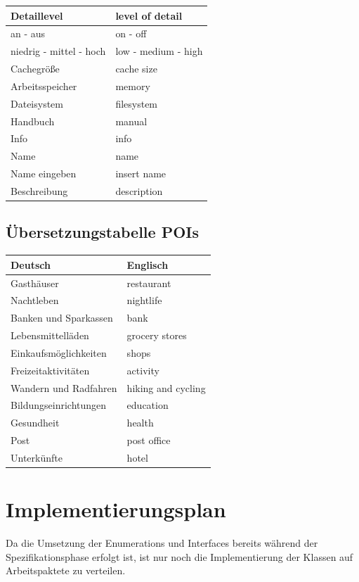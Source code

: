 \documentclass[10pt]{scrreprt}
\begin{document}
\begin{longtable}{|p{7.5cm}|p{7.5cm}|}
\hline
Detaillevel & level of detail \\
\hline
an - aus & on - off \\
\hline
niedrig - mittel - hoch & low - medium - high\\
\hline
Cachegröße & cache size \\
\hline
Arbeitsspeicher & memory \\
\hline
Dateisystem & filesystem \\
\hline
Handbuch & manual \\
\hline
Info & info \\
\hline
Name & name \\
\hline
Name eingeben & insert name \\
\hline
Beschreibung & description \\
\hline
\end{longtable}

\newpage
\section{Übersetzungstabelle POIs}
\begin{longtable}{|p{7.5cm}|p{7.5cm}|}
\hline 
\textbf{Deutsch} & \textbf{Englisch} \\ 
\hline
\hline 
Gasthäuser & restaurant \\ 
\hline
Nachtleben & nightlife \\ 
\hline
Banken und Sparkassen & bank \\ 
\hline
Lebensmittelläden & grocery stores \\ 
\hline
Einkaufsmöglichkeiten & shops \\ 
\hline
Freizeitaktivitäten & activity \\ 
\hline
Wandern und Radfahren & hiking and cycling \\
\hline
Bildungseinrichtungen & education \\
\hline
Gesundheit & health \\
\hline
Post & post office \\ 
\hline
Unterkünfte & hotel \\
\hline
\end{longtable}





\chapter{Implementierungsplan}

Da die Umsetzung der Enumerations und Interfaces bereits während der Spezifikationsphase erfolgt ist, ist nur noch die Implementierung der Klassen auf Arbeitspaktete zu verteilen.
\end{document}
